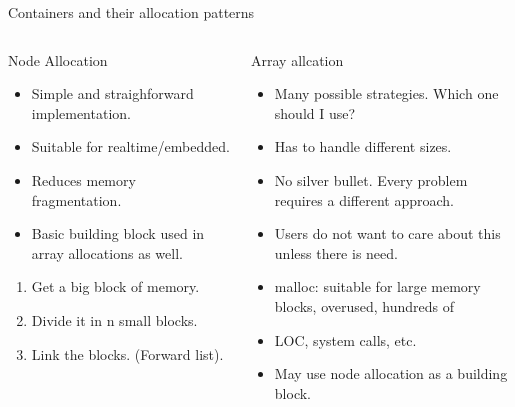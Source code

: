 \documentclass[10pt,aspectratio=169]{beamer}
\begin{document}
\begin{frame}[fragile]{Containers and their allocation patterns}
\begin{columns}
\begin{column}{0.5\textwidth}

Node Allocation

\begin{itemize}
\item Simple and straighforward implementation.
\item Suitable for realtime/embedded.
\item Reduces memory fragmentation.
\item Basic building block used in array allocations as well.
\end{itemize}

\begin{enumerate}
\item Get a big block of memory.
\item Divide it in n small blocks.
\item Link the blocks. (Forward list).
\end{enumerate}
\end{column}

\begin{column}{0.5\textwidth}
Array allcation
\begin{itemize}
\item Many possible strategies. Which one should I use?
\item Has to handle different sizes.
\item No silver bullet. Every problem requires a different approach.
\item Users do not want to care about this unless there is need.
\item malloc: suitable for large memory blocks, overused, hundreds of
\item LOC, system calls, etc.
\item May use node allocation as a building block.
\end{itemize}

\end{column}
\end{columns}
\end{frame}
\end{document}
